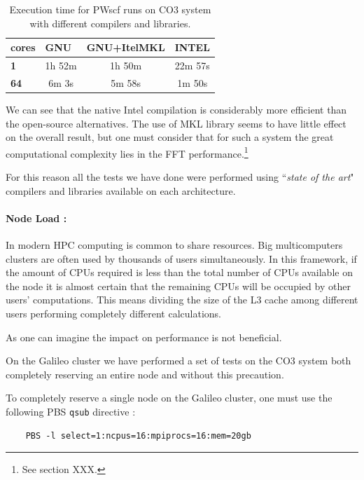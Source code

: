 \documentclass[a4paper,12pt]{article}
\newcommand\CO{CO3 }
\begin{document}
\begin{table}[h]
\centering
\begin{tabular}{lccc}
\textbf{cores} & \multicolumn{1}{l}{\textbf{GNU}} & \multicolumn{1}{l}{\textbf{GNU+ItelMKL}} & \multicolumn{1}{l}{\textbf{INTEL}} \\ \hline \hline
\textbf{1}     & 1h 52m                           & 1h 50m                                   & 22m 57s                            \\
\textbf{64}    & 6m 3s                            & 5m 58s                                   & 1m 50s                            
\end{tabular}
\caption{Execution time for PWscf runs on CO3 system with different compilers and libraries.}
\label{tab:libraries}
\end{table}

We can see that the native Intel compilation is considerably more efficient than the open-source alternatives.
The use of MKL library seems to have little effect on the overall result, but one must consider that for such a system the great computational complexity lies in the FFT performance.\footnote{See section XXX.}

\begin{framed}
For this reason all the tests we have done were performed using ``\textit{state of the art}" compilers and libraries available on each architecture.
\end{framed}


\paragraph{Node Load : }

In modern HPC computing is common to share resources. Big multicomputers clusters are often used by thousands of users simultaneously.
In this framework, if the amount of CPUs required is less than the total number of CPUs available on the node it is almost certain that the remaining CPUs will be occupied by other users' computations.
This means dividing the size of the L3 cache among different users performing completely different calculations.

As one can imagine the impact on performance is not beneficial.

On the Galileo cluster we have performed a set of tests on the \CO  system both completely reserving an entire node and without this precaution.

To completely reserve a single node on the Galileo cluster, one must use the following PBS \texttt{qsub} directive :
\begin{verbatim}
	PBS -l select=1:ncpus=16:mpiprocs=16:mem=20gb
\end{verbatim}
\end{document}
